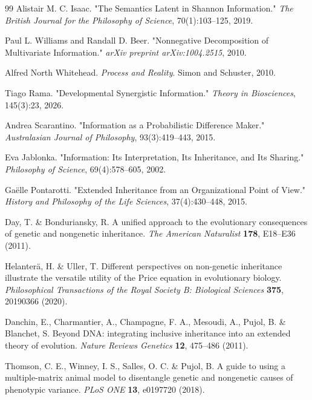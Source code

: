 \documentclass[pdflatex,sn-mathphys-num]{sn-jnl}
\theoremstyle{thmstylethree}
\theoremstyle{thmstyleone}
\begin{document}
\begin{thebibliography}{99}
Alistair M. C. Isaac.
"The Semantics Latent in Shannon Information."
\textit{The British Journal for the Philosophy of Science},
70(1):103--125, 2019.


Paul L. Williams and Randall D. Beer.
"Nonnegative Decomposition of Multivariate Information."
\textit{arXiv preprint arXiv:1004.2515}, 2010.

Alfred North Whitehead.
\textit{Process and Reality}.
Simon and Schuster, 2010.

Tiago Rama.
"Developmental Synergistic Information."
\textit{Theory in Biosciences}, 145(3):23, 2026.

Andrea Scarantino.
"Information as a Probabilistic Difference Maker."
\textit{Australasian Journal of Philosophy},
93(3):419--443, 2015.

Eva Jablonka.
"Information: Its Interpretation, Its Inheritance, and Its Sharing."
\textit{Philosophy of Science}, 69(4):578--605, 2002.

Ga\"{e}lle Pontarotti.
"Extended Inheritance from an Organizational Point of View."
\textit{History and Philosophy of the Life Sciences},
37(4):430--448, 2015.

Day, T. \& Bonduriansky, R. A unified approach to the evolutionary consequences of genetic and nongenetic inheritance. \textit{The American Naturalist} \textbf{178}, E18--E36 (2011).

Helanter\"{a}, H. \& Uller, T. Different perspectives on non-genetic inheritance illustrate the versatile utility of the Price equation in evolutionary biology. \textit{Philosophical Transactions of the Royal Society B: Biological Sciences} \textbf{375}, 20190366 (2020).

Danchin, E., Charmantier, A., Champagne, F. A., Mesoudi, A., Pujol, B. \& Blanchet, S. Beyond DNA: integrating inclusive inheritance into an extended theory of evolution. \textit{Nature Reviews Genetics} \textbf{12}, 475--486 (2011).

Thomson, C. E., Winney, I. S., Salles, O. C. \& Pujol, B. A guide to using a multiple-matrix animal model to disentangle genetic and nongenetic causes of phenotypic variance. \textit{PLoS ONE} \textbf{13}, e0197720 (2018).


\end{thebibliography}
\end{document}
